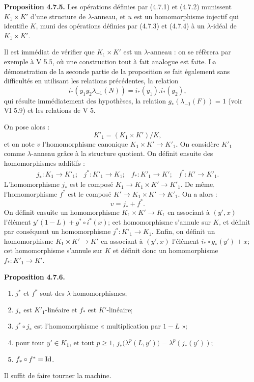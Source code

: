 \textbf{Proposition 4.7.5.} Les opérations définies par (4.7.1) et (4.7.2) munissent \(K_1\times K'\) d'une structure de \(\lambda\)-anneau, et \(u\) est un homomorphisme injectif qui identifie \(K\), muni des opérations définies par (4.7.3) et (4.7.4) à un \(\lambda\)-idéal de \(K_1\times K'\).

Il est immédiat de vérifier que \(K_1\times K'\) est un \(\lambda\)-anneau : on se réfèrera par exemple à V 5.5, où une construction tout à fait analogue est faite. La démonstration de la seconde partie de la proposition se fait également sans difficultés en utilisant les relations précédentes, la relation
\[
  i_*(y_1y_2\lambda_{-1}(N))=i_*(y_1).i_*(y_2),
\]
qui résulte immédiatement des hypothèses, la relation \(g_*(\lambda_{-1}(F))=1\) (voir VI 5.9) et les relations de V 5.

On pose alors :
\[
  K'_1=(K_1\times K')/K,
\]
et on note \(v\) l'homomorphisme canonique \(K_1\times K'\to K'_1\). On considère \(K'_1\) comme \(\lambda\)-anneau grâce à la structure quotient. On définit ensuite des homomorphismes additifs :
\[
\begin{array}{llll}
j_*:K_1\to K'_1; & j^*:K'_1\to K_1; &
f_*:K'_1\to K'; & f^*:K'\to K'_1 .
\end{array}
\]
L'homomorphisme \(j_*\) est le composé \(K_1\to K_1\times K'\to K'_1\). De même, l'homomorphisme \(f^*\) est le composé \(K'\to K_1\times K'\to K'_1\). On a alors :
\[
  v=j_*+f^*.
\]
On
définit ensuite un homomorphisme \(K_1\times K'\to K_1\) en associant à \((y',x)\) l'élément \(y'(1-L)+g^*\circ i^*(x)\); cet homomorphisme s'annule sur \(K\), et définit par conséquent un homomorphisme \(j^*:K'_1\longrightarrow K_1\). Enfin, on définit un homomorphisme \(K_1\times K'\to K'\) en associant à \((y',x)\) l'élément \(i_*\circ g_*(y')+x\); cet homomorphisme s'annule sur \(K\) et définit donc un homomorphisme \(f_*:K'_1\longrightarrow K'\).

\textbf{Proposition 4.7.6.}
\begin{enumerate}[label=\roman*)]
\item \(j^*\) et \(f^*\) sont des \(\lambda\)-homomorphismes;
\item \(j_*\) est \(K'_1\)-linéaire et \(f_*\) est \(K'\)-linéaire;
\item \(j^*\circ j_*\) est l'homomorphisme « multiplication par \(1-L\) »;
\item pour tout \(y'\in K_1\), et tout \(p\ge1\), \(j_*\bigl(\lambda^p(L,y')\bigr)=\lambda^p(j_*(y'))\);
\item \(f_*\circ f^*=\operatorname{Id}\).
\end{enumerate}
Il suffit de faire tourner la machine.

